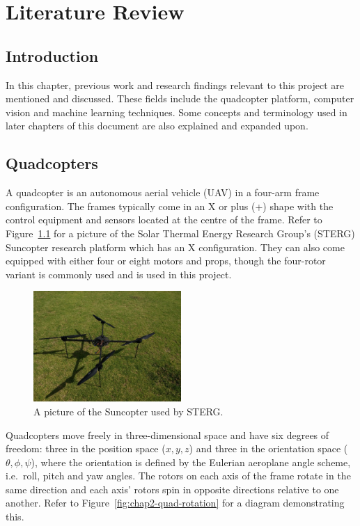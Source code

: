 \chapter{Literature Review}
\label{chap2}

\section{Introduction}

In this chapter, previous work and research findings relevant to this project are mentioned and discussed. These fields include the quadcopter platform, computer vision and machine learning techniques. Some concepts and terminology used in later chapters of this document are also explained and expanded upon.

\section{Quadcopters}

A quadcopter is an autonomous aerial vehicle (UAV) in a four-arm frame configuration. The frames typically come in an X or plus (+) shape with the control equipment and sensors located at the centre of the frame. Refer to Figure~\ref{fig:chap2-quad} for a picture of the Solar Thermal Energy Research Group's (STERG) Suncopter research platform which has an X configuration. They can also come equipped with either four or eight motors and props, though the four-rotor variant is commonly used and is used in this project.

\begin{figure}
  \centering
  \includegraphics[clip, trim = 0 0 30 20, width=0.5\textwidth]{figures/chapter2/quadcopter}
  \caption[A picture of the Suncopter used by STERG.]{A picture of the Suncopter used by STERG.}
\label{fig:chap2-quad}
\end{figure}

Quadcopters move freely in three-dimensional space and have six degrees of freedom: three in the position space ($x, y, z$) and three in the orientation space ($\theta, \phi, \psi$), where the orientation is defined by the Eulerian aeroplane angle scheme, i.e.\ roll, pitch and yaw angles. The rotors on each axis of the frame rotate in the same direction and each axis' rotors spin in opposite directions relative to one another. Refer to Figure~\ref{fig:chap2-quad-rotation} for a diagram demonstrating this. 

